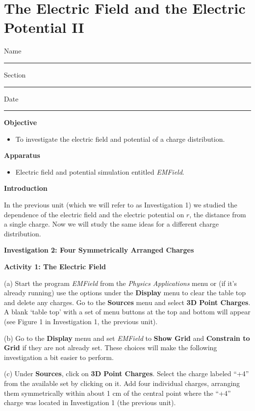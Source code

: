 
\section{The Electric Field and the Electric Potential II}

Name \rule{2.0in}{0.1pt}\hfill{}Section \rule{1.0in}{0.1pt}\hfill{}Date
\rule{1.0in}{0.1pt}

\textbf{Objective}

\begin{itemize}
\item To investigate the electric field and potential of a charge distribution.
\end{itemize}

\textbf{Apparatus}

\begin{itemize}
\item Electric field and potential simulation entitled {\it EMField}.
\end{itemize}

\textbf{Introduction}

In the previous unit (which we will refer to as Investigation 1) we studied the dependence
of the electric field and the electric potential on $r$, the distance from a
single charge.
Now we will study the same ideas for a different charge distribution.

\textbf{Investigation 2: Four Symmetrically Arranged Charges}

\textbf{Activity 1: The Electric Field}

(a) Start the program {\it EMField} from the {\it Physics Applications} menu or (if it's already running) use the options under the 
\textbf{Display} menu to clear the table top and delete any charges.
Go to the \textbf{Sources} menu and select \textbf{3D Point Charges}.
A blank `table top' with a set of menu 
buttons at the top and bottom will appear (see Figure 1 in Investigation 1, the previous unit).

(b) Go to the \textbf{Display} menu and set {\it EMField} to
{\bf Show Grid} and {\bf Constrain to Grid} if they are not already set.
These choices will make the following investigation a bit easier to perform.

(c) Under \textbf{Sources}, click on \textbf{3D Point Charges}. Select the
charge labeled {}``+4'' from the available set by clicking on it.
Add four individual charges, arranging them symmetrically within about
1 cm of the central point where the {}``+4'' charge was located
in Investigation 1 (the previous unit). 

